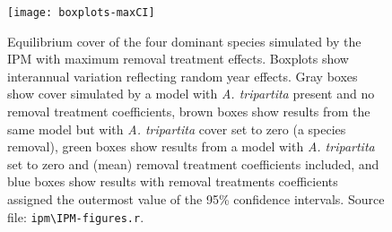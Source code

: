 \documentclass[11pt]{article}
\begin{document}
 
  \begin{figure}[tbp]
  \centering
  \texttt{[image: boxplots-maxCI]}
  \caption{Equilibrium cover of the four dominant species simulated by the IPM with maximum removal treatment effects. Boxplots show interannual variation reflecting random year effects. Gray boxes show cover simulated by a model with \textit{A. tripartita} present and no removal treatment coefficients, brown boxes show results from the same model but with \textit{A. tripartita} cover set to zero (a species removal), green boxes show results from a model with  \textit{A. tripartita} set to zero and (mean) removal treatment coefficients included, and blue boxes show results with removal treatments coefficients assigned the outermost value of the 95\% confidence intervals.  Source file: \texttt{ipm\textbackslash IPM-figures.r}.}
  \label{fig:IPMresults-maxCI}
  \end{figure}
\end{document}
